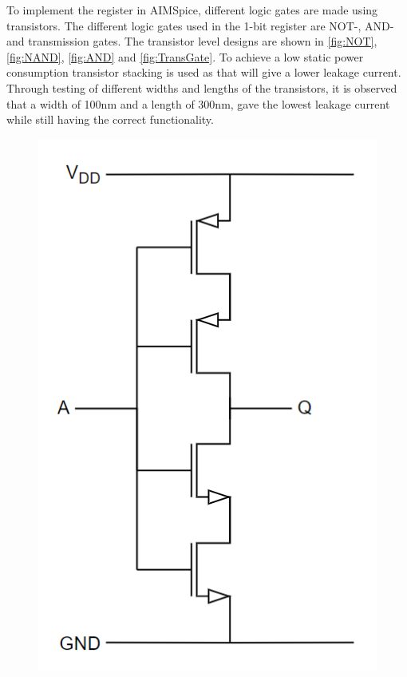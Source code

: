 To implement the register in AIMSpice, different logic gates are made using transistors. The different logic gates used in the 1-bit register are NOT-, AND- and transmission gates. The transistor level designs are shown in \autoref{fig:NOT}, \ref{fig:NAND}, \ref{fig:AND} and \ref{fig:TransGate}. To achieve a low static power consumption transistor stacking is used as that will give a lower leakage current. Through testing of different widths and lengths of the transistors, it is observed that a width of 100nm and a length of 300nm, gave the lowest leakage current while still having the correct functionality. 

\begin{figure}[H]
\centering
\begin{minipage}{0.4\textwidth}
    \centering
    \includegraphics[width=\linewidth]{Figures/Not gate.png}

\end{minipage}
\end{figure}
